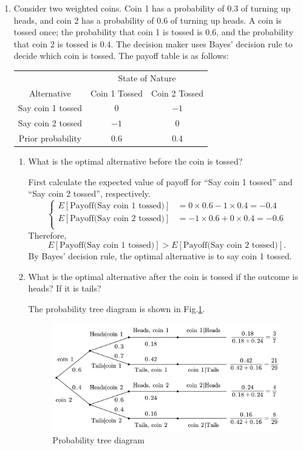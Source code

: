 \documentclass[a4paper]{article}
\begin{document}
\begin{enumerate}
\item Consider two weighted coins. Coin 1 has a probability of 0.3 of turning up heads, and coin 2 has a probability of 0.6 of turning up heads. A coin is tossed once; the probability that coin 1 is tossed is 0.6, and the probability that coin 2 is tossed is 0.4. The decision maker uses Bayes' decision rule to decide which coin is tossed. The payoff table is as follows:
\begin{table}[h]
  	\centering
  	\begin{tabular}{ccc}
  		\toprule[1.5pt]
  		&\multicolumn{2}{c}{State of Nature}\\
  		\cmidrule{2-3}  		
  		Alternative &Coin 1 Tossed&Coin 2 Tossed\\
  		\midrule
		Say coin 1 tossed&0&$-1$\\
		Say coin 2 tossed&$-1$&0\\
		\midrule
		Prior probability&0.6&0.4\\
  		\bottomrule[1.5pt]
  	\end{tabular}
  \end{table}
  \begin{enumerate}
\item What is the optimal alternative before the coin is tossed?
\begin{solution}

First calculate the expected value of payoff for ``Say coin 1 tossed'' and ``Say coin 2 tossed'', respectively.
\begin{equation*}\left\{
\begin{aligned}
E[\text{Payoff(Say coin 1 tossed)}]&=0\times0.6-1\times0.4=-0.4\\
E[\text{Payoff(Say coin 2 tossed)}]&=-1\times0.6+0\times0.4=-0.6\\
\end{aligned}\right.
\end{equation*}
Therefore,
$$
E[\text{Payoff(Say coin 1 tossed)}]>E[\text{Payoff(Say coin 2 tossed)}].
$$
By Bayes' decision rule, the optimal alternative is to say coin 1 tossed.
\end{solution}

\item What is the optimal alternative after the coin is tossed if the outcome is heads? If it is tails?
\begin{solution}

The probability tree diagram is shown in Fig.\ref{HW7}.
\begin{figure}[!h]
\centering
\caption{Probability tree diagram}
\label{HW7}
\includegraphics[width=.8\textwidth]{HW7}
\end{figure}


\end{solution}
\end{enumerate}
\end{enumerate}
\end{document}
